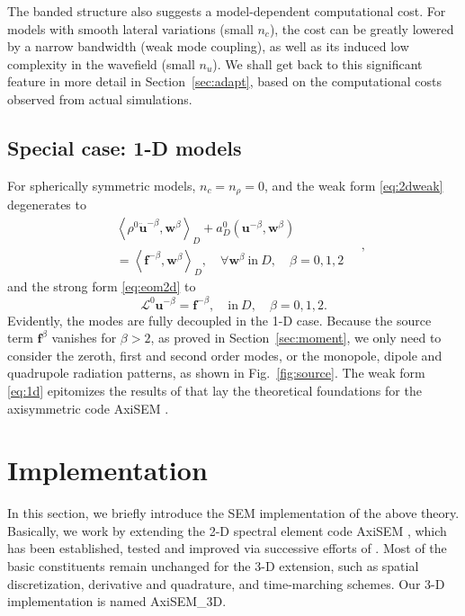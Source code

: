 \documentclass[extra]{gji}
\begin{document}
The banded structure also suggests a model-dependent computational cost. 
For models with smooth lateral variations (small $n_c$),  
the cost can be greatly lowered by a narrow bandwidth (weak mode coupling),
as well as its induced low complexity in the wavefield (small $n_u$).
We shall get back to this significant feature in more detail in 
Section~\ref{sec:adapt}, based on the computational costs observed from 
actual simulations.

\subsection{Special case: 1-D models}
\label{sec:1d}
For spherically symmetric models, $n_c=n_\rho=0$, and the weak form \eqref{eq:2dweak} 
degenerates to
\begin{equation}
  \begin{alignedat}{1}
    & \left\langle \rho^{0}
    \ddot{\mathbf{u}}^{-\beta},\mathbf{w}^\beta \right\rangle _{D}
    + a_D^0
    \left(\mathbf{u}^{-\beta},\mathbf{w}^\beta\right)\\&= 
    \left\langle \mathbf{f}^{-\beta},\mathbf{w}^\beta \right\rangle _{D},\quad
    \forall \mathbf{w}^\beta\ \text{in}\ D, \quad 
    \beta=0,1,2
  \end{alignedat}\quad,
  \label{eq:1d}
\end{equation}
and the strong form \eqref{eq:eom2d} to 
\begin{equation}
  \mathscr{L}^0\mathbf{u}^{-\beta}=\mathbf{f}^{-\beta}, 
  \quad \text{in}\ D, \quad \beta=0,1,2.
\end{equation}
Evidently, the modes are fully decoupled in the 1-D case. 
Because the source term $\mathbf{f}^\beta$ vanishes for $\beta>2$,
as proved in Section~\ref{sec:moment}, we only need to consider 
the zeroth, first and second order modes, or the monopole, dipole 
and quadrupole radiation patterns, as shown in Fig.~\ref{fig:source}.
The weak form \eqref{eq:1d} epitomizes the results of 
\cite{nissen2007axisem} that lay the theoretical foundations
for the axisymmetric code AxiSEM \cite[]{nissen2014axisem}.


\section{Implementation}
\label{sec:imp}
In this section, we briefly introduce the SEM implementation of the above
theory. Basically, we work by extending the 2-D spectral element code 
AxiSEM \cite[]{nissen2014axisem}, which has been established, tested
and improved via successive efforts of \cite{nissen2007sem, nissen2008sem,
van2014seismic, van2014optimized}. 
Most of the basic constituents remain unchanged for the 3-D extension,
such as spatial discretization, derivative and quadrature, and time-marching schemes.
Our 3-D implementation is named AxiSEM\_3D. 
\end{document}
